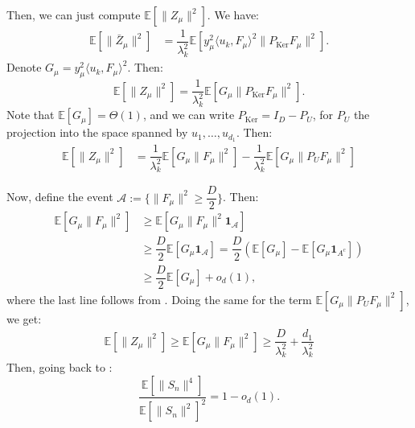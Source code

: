 \documentclass[]{article}
\numberwithin{equation}{section}
\theoremstyle{definition}
\newcommand{\EE}{\mathbb{E}}
\begin{document}
Then, we can just compute $\EE[\|Z_\mu\|^{2}]$. We have: 
\begin{align}
    \EE[\|\bar{Z}_\mu\|^{2}] & =  \dfrac{1}{\lambda_k^2}\mathbb{E} \left [ y_\mu^{2} \langle u_{k}, F_\mu\rangle^{2} \| P_{\mathrm{Ker}}F_{\mu }\|^{2} \right ]. 
\end{align}
Denote $G_{\mu} = y_\mu^2 \langle u_{k}, F_\mu\rangle^2$. Then: 
\begin{equation}
    \EE[\|Z_\mu\|^{2}] = \dfrac{1}{\lambda_k^2}\mathbb{E} \left [G_\mu \| P_{\mathrm{Ker}}F_{\mu }\|^{2} \right ].
\end{equation}
Note that $\EE[G_\mu] = \Theta(1)$, and we can write $P_\mathrm{Ker}  = I_{D} - P_U$, for $P_U$ the projection into the space spanned by $u_1, \dots, u_{d_1}$. Then: 
\begin{align}
    \EE[\|Z_\mu\|^{2}] & = \dfrac{1}{\lambda_k^2}\mathbb{E} \left [G_\mu \| F_{\mu }\|^{2} \right ] - \dfrac{1}{\lambda_k^2}\mathbb{E} \left [G_\mu \| P_UF_{\mu }\|^{2} \right ] 
\end{align}

Now, define the event $\mathcal{A}:= \{ \| F_\mu \|^2\geq \dfrac{D}{2}\}$. Then: 
\begin{align}
    \mathbb{E} \left [G_\mu \| F_{\mu }\|^{2} \right ] &\geq \mathbb{E} \left [G_\mu \| F_{\mu }\|^{2} \mathbf{1}_{\mathcal{A}}\right ] \\
    & \geq \dfrac{D}{2}\mathbb{E} \left [G_\mu \mathbf{1}_{\mathcal{A}}\right ] = \dfrac{D}{2}\left ( \mathbb{E} \left [G_\mu\right ] -  \mathbb{E} \left [G_\mu \mathbf{1}_{A^{c}}\right ]\right ) \\
    & \geq \dfrac{D}{2}\mathbb{E} \left [G_\mu\right ] + o_{d}(1),
\end{align}
where the last line follows from . Doing the same for the term $\mathbb{E} \left [G_\mu \| P_UF_{\mu }\|^{2} \right ] $, we get: 
\begin{align}
    \EE\left [ \| Z_{\mu}\|^2 \right ] \geq \mathbb{E} \left [G_\mu \| F_{\mu }\|^{2} \right ] \geq \dfrac{D}{\lambda_{k}^2} + \dfrac{d_1}{\lambda_{k}^2}
\end{align}
Then, going back to :
\begin{equation}
    \dfrac{\EE \left [ \| S_{n} \|^{4}\right ]}{\EE \left [ \|S_{n}\|^2\right ]^2}  = 1-o_{d}(1). 
\end{equation}
\end{document}
